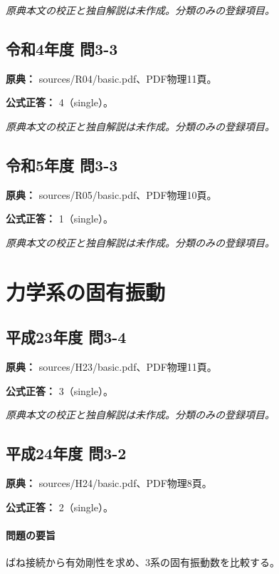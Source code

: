 \par\textit{原典本文の校正と独自解説は未作成。分類のみの登録項目。}

\subsection{令和4年度 問3-3}
\label{q:r04-reg-basic-3-3}

\noindent\textbf{原典：} sources/R04/basic.pdf、PDF物理11頁。

\textbf{公式正答：} 4（single）。

\par\textit{原典本文の校正と独自解説は未作成。分類のみの登録項目。}

\subsection{令和5年度 問3-3}
\label{q:r05-reg-basic-3-3}

\noindent\textbf{原典：} sources/R05/basic.pdf、PDF物理10頁。

\textbf{公式正答：} 1（single）。

\par\textit{原典本文の校正と独自解説は未作成。分類のみの登録項目。}

\section{力学系の固有振動}

\subsection{平成23年度 問3-4}
\label{q:h23-reg-basic-3-4}

\noindent\textbf{原典：} sources/H23/basic.pdf、PDF物理11頁。

\textbf{公式正答：} 3（single）。

\par\textit{原典本文の校正と独自解説は未作成。分類のみの登録項目。}

\subsection{平成24年度 問3-2}
\label{q:h24-reg-basic-3-2}

\noindent\textbf{原典：} sources/H24/basic.pdf、PDF物理8頁。

\textbf{公式正答：} 2（single）。

\paragraph{問題の要旨} ばね接続から有効剛性を求め、3系の固有振動数を比較する。


